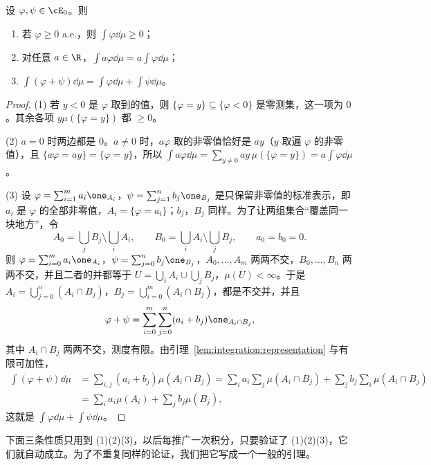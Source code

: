\begin{proposition}\label{prop:integration:simple}
设 $\varphi,\psi\in\cE_0$。则
\begin{enumerate}
\item 若 $\varphi\geqslant0$ a.e.，则 $\int\varphi\dd\mu\geqslant0$；
\item 对任意 $a\in\R$，$\int a\varphi\dd\mu=a\int\varphi\dd\mu$；
\item $\int(\varphi+\psi)\dd\mu=\int\varphi\dd\mu+\int\psi\dd\mu$。
\end{enumerate}
\end{proposition}
\begin{proof}
(1) 若 $y<0$ 是 $\varphi$ 取到的值，则 $\{\varphi=y\}\subseteq\{\varphi<0\}$ 是零测集，这一项为 $0$。其余各项 $y\mu(\{\varphi=y\})$ 都 $\geqslant0$。

(2) $a=0$ 时两边都是 $0$。$a\neq0$ 时，$a\varphi$ 取的非零值恰好是 $ay$（$y$ 取遍 $\varphi$ 的非零值），且 $\{a\varphi=ay\}=\{\varphi=y\}$，所以 $\int a\varphi\dd\mu=\sum_{y\neq0}ay\,\mu(\{\varphi=y\})=a\int\varphi\dd\mu$。

(3) 设 $\varphi=\sum_{i=1}^ma_i\one_{A_i}$，$\psi=\sum_{j=1}^nb_j\one_{B_j}$ 是只保留非零值的标准表示，即 $a_i$ 是 $\varphi$ 的全部非零值，$A_i=\{\varphi=a_i\}$；$b_j$，$B_j$ 同样。为了让两组集合“覆盖同一块地方”，令
\[
A_0=\bigcup_jB_j\setminus\bigcup_iA_i,\qquad B_0=\bigcup_iA_i\setminus\bigcup_jB_j,\qquad a_0=b_0=0.
\]
则 $\varphi=\sum_{i=0}^ma_i\one_{A_i}$，$\psi=\sum_{j=0}^nb_j\one_{B_j}$，$A_0,\dots,A_m$ 两两不交，$B_0,\dots,B_n$ 两两不交，并且二者的并都等于 $U=\bigcup_iA_i\cup\bigcup_jB_j$，$\mu(U)<\infty$。于是 $A_i=\bigcup_{j=0}^n(A_i\cap B_j)$，$B_j=\bigcup_{i=0}^m(A_i\cap B_j)$，都是不交并，并且
\[
\varphi+\psi=\sum_{i=0}^m\sum_{j=0}^n(a_i+b_j)\one_{A_i\cap B_j},
\]
其中 $A_i\cap B_j$ 两两不交，测度有限。由引理~\ref{lem:integration:representation} 与有限可加性，
\[
\begin{aligned}
\int(\varphi+\psi)\dd\mu&=\sum_{i,j}(a_i+b_j)\mu(A_i\cap B_j)=\sum_ia_i\sum_j\mu(A_i\cap B_j)+\sum_jb_j\sum_i\mu(A_i\cap B_j)\\
&=\sum_ia_i\mu(A_i)+\sum_jb_j\mu(B_j),
\end{aligned}
\]
这就是 $\int\varphi\dd\mu+\int\psi\dd\mu$。
\end{proof}

下面三条性质只用到 (1)(2)(3)，以后每推广一次积分，只要验证了 (1)(2)(3)，它们就自动成立。为了不重复同样的论证，我们把它写成一个一般的引理。

